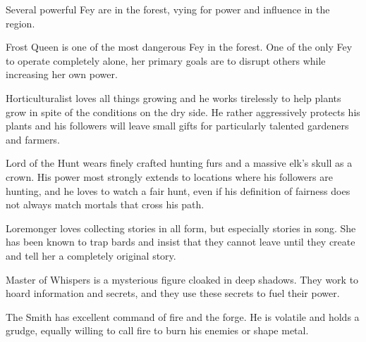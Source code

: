 Several powerful Fey are in the forest, vying for power and influence in the region.

Frost Queen is one of the most dangerous Fey in the forest.
One of the only Fey to operate completely alone, her primary goals are to disrupt others while increasing her own power.

Horticulturalist loves all things growing and he works tirelessly to help plants grow in spite of the conditions on the dry side.
He rather aggressively protects his plants and his followers will leave small gifts for particularly talented gardeners and farmers.

Lord of the Hunt wears finely crafted hunting furs and a massive elk's skull as a crown.
His power most strongly extends to locations where his followers are hunting, and he loves to watch a fair hunt, even if his definition of fairness does not always match mortals that cross his path.

Loremonger loves collecting stories in all form, but especially stories in song.
She has been known to trap bards and insist that they cannot leave until they create and tell her a completely original story.

Master of Whispers is a mysterious figure cloaked in deep shadows.
They work to hoard information and secrets, and they use these secrets to fuel their power.

The Smith has excellent command of fire and the forge.
He is volatile and holds a grudge, equally willing to call fire to burn his enemies or shape metal.
